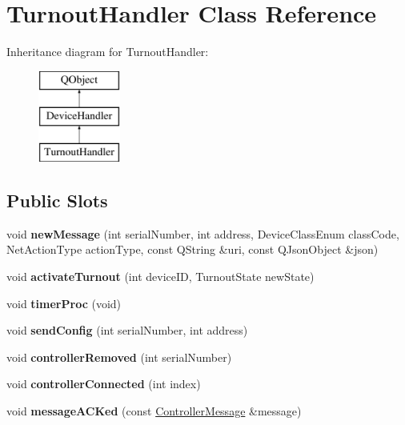 \hypertarget{class_turnout_handler}{}\section{Turnout\+Handler Class Reference}
\label{class_turnout_handler}
Inheritance diagram for Turnout\+Handler\+:\begin{figure}[H]
\begin{center}
\leavevmode
\includegraphics[height=3.000000cm]{class_turnout_handler}
\end{center}
\end{figure}
\subsection*{Public Slots}
\begin{DoxyCompactItemize}
\item 
\mbox{\label{class_turnout_handler_aa6d1a7bce510b3d3bc092c83157ea9d7}} 
void {\bfseries new\+Message} (int serial\+Number, int address, Device\+Class\+Enum class\+Code, Net\+Action\+Type action\+Type, const Q\+String \&uri, const Q\+Json\+Object \&json)
\item 
\mbox{\label{class_turnout_handler_af98a879c6e94f86901597f2204aafac2}} 
void {\bfseries activate\+Turnout} (int device\+ID, Turnout\+State new\+State)
\item 
\mbox{\label{class_turnout_handler_ad250479f8c68d9195bbd6ae09bce2981}} 
void {\bfseries timer\+Proc} (void)
\item 
\mbox{\label{class_turnout_handler_ae2954780d7cf786caa6915102ca90fac}} 
void {\bfseries send\+Config} (int serial\+Number, int address)
\item 
\mbox{\label{class_turnout_handler_adfc83db04edca044530eb60d218df955}} 
void {\bfseries controller\+Removed} (int serial\+Number)
\item 
\mbox{\label{class_turnout_handler_af43378afbad7e068ad7e78dc4f1171bf}} 
void {\bfseries controller\+Connected} (int index)
\item 
\mbox{\label{class_turnout_handler_adef14f53ff303fdb9ca4599a1a7479b9}} 
void {\bfseries message\+A\+C\+Ked} (const \hyperlink{class_controller_message}{Controller\+Message} \&message)
\end{DoxyCompactItemize}
